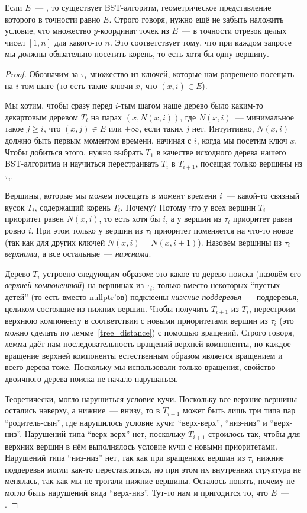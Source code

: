 \begin{theorem}\label{arbs_to_bst} Если $E$~--- \arbs, то существует BST-алгоритм, геометрическое представление
	которого в точности равно $E$. Строго говоря, нужно ещё не забыть наложить
	условие, что множество $y$-координат точек из $E$~--- в точности отрезок целых чисел $[1, n]$ для какого-то $n$. Это соответствует тому, что при каждом запросе мы должны обязательно посетить корень, то есть хотя бы одну вершину.
\end{theorem}
\begin{proof} Обозначим за $\tau_i$ множество из ключей, которые нам разрешено посещать на $i$-том шаге (то есть такие ключи $x$, что $(x, i) \in E$).

	Мы хотим, чтобы сразу перед $i$-тым шагом наше дерево было каким-то декартовым деревом $T_i$ на парах $(x, N(x, i))$, где $N(x, i)$~--- минимальное такое $j \geqslant i$, что $(x, j) \in E$ или $+\infty$, если таких $j$ нет. Интуитивно, $N(x, i)$ должно быть первым моментом времени, начиная с $i$, когда мы посетим ключ $x$. Чтобы добиться этого,
	нужно выбрать $T_1$ в качестве исходного дерева нашего BST-алгоритма и научиться перестраивать $T_i$ в $T_{i+1}$, посещая только вершины из $\tau_i$.

	Вершины, которые мы можем посещать в момент времени $i$~--- какой-то связный кусок $T_i$, содержащий корень $T_i$. Почему? Потому что у всех вершин $T_i$ приоритет равен $N(x, i)$, то есть хотя бы $i$, а у вершин из $\tau_i$ приоритет равен ровно $i$. При этом только
	у вершин из $\tau_i$ приоритет поменяется на что-то новое (так как для других ключей $N(x, i) = N(x, i + 1)$).  Назовём вершины из $\tau_i$ \emph{верхними}, а все остальные~--- \emph{нижними}.

	Дерево $T_i$ устроено следующим образом: это какое-то дерево поиска (назовём его \emph{верхней компонентой}) на вершинах из $\tau_i$, только вместо некоторых ``пустых детей'' (то есть вместо \textrm{nullptr}'ов) подклеены \emph{нижние поддеревья}~--- поддеревья, целиком состоящие из нижних вершин. Чтобы получить $T_{i + 1}$ из $T_i$, перестроим верхнюю компоненту в соответствии с новыми приоритетами вершин из $\tau_i$ (это можно сделать по лемме~\ref{tree_distance}) с помощью вращений. Строго говоря, лемма даёт нам последовательность вращений верхней компоненты, но каждое вращение верхней компоненты естественным образом является вращением и всего дерева тоже. Поскольку мы использовали только вращения, свойство двоичного дерева поиска не начало нарушаться.

	Теоретически, могло нарушиться условие кучи. Поскольку все верхние вершины остались наверху, а нижние~--- внизу, то в $T_{i + 1}$ может быть лишь три типа пар ``родитель-сын'', где нарушилось условие кучи: ``верх-верх'', ``низ-низ'' и ``верх-низ''. Нарушений типа ``верх-верх''
	нет, поскольку $T_{i + 1}$ строилось так, чтобы для верхних вершин в нём выполнялось условие кучи с новыми приоритетами. Нарушений типа ``низ-низ'' нет, так как при вращениях вершин из $\tau_i$ нижние поддеревья могли как-то переставляться, но при этом их внутренняя структура не менялась, так как мы не трогали нижние вершины. Осталось понять, почему не могло быть нарушений вида ``верх-низ''. Тут-то нам и пригодится то, что $E$~--- \arbs.


\end{proof}
